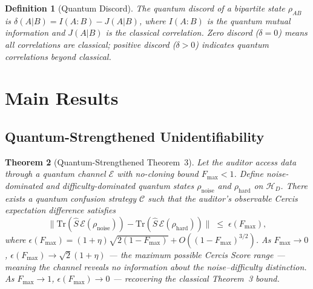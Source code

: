 \documentclass[12pt,a4paper]{article}
\newtheorem{theorem}{Theorem}[section]
\newtheorem{definition}[theorem]{Definition}
\newcommand{\cH}{\mathcal{H}}
\newcommand{\cE}{\mathcal{E}}
\newcommand{\cC}{\mathcal{C}}
\newcommand{\Tr}{\mathrm{Tr}}
\begin{document}
\begin{definition}[Quantum Discord]
\label{def:discord}
The quantum discord of a bipartite state $\rho_{AB}$ is
$\delta(A|B) = I(A:B) - J(A|B)$, where $I(A:B)$ is the quantum mutual
information and $J(A|B)$ is the classical correlation.  Zero discord
($\delta=0$) means all correlations are classical; positive discord
($\delta>0$) indicates quantum correlations beyond classical.
\end{definition}

\section{Main Results}

\subsection{Quantum-Strengthened Unidentifiability}

\begin{theorem}[Quantum-Strengthened Theorem~3]
\label{thm:quantum-strong}
Let the auditor access data through a quantum channel $\cE$ with no-cloning
bound $F_{\max}<1$.  Define noise-dominated and difficulty-dominated quantum
states $\rho_{\mathrm{noise}}$ and $\rho_{\mathrm{hard}}$ on $\cH_D$.
There exists a quantum confusion strategy $\cC$ such that the auditor's
observable Cercis expectation difference satisfies
\begin{equation}\label{eq:quantum-barrier}
    \big\|\Tr(\hat{S}\,\cE(\rho_{\mathrm{noise}}))
          - \Tr(\hat{S}\,\cE(\rho_{\mathrm{hard}}))\big\|
    \;\leq\; \epsilon(F_{\max}),
\end{equation}
where $\epsilon(F_{\max}) = (1+\eta)\sqrt{2(1-F_{\max})} + O((1-F_{\max})^{3/2})$.
As $F_{\max}\to0$, $\epsilon(F_{\max})\to\sqrt{2}(1+\eta)$ — the maximum
possible Cercis Score range — meaning the channel reveals \emph{no}
information about the noise--difficulty distinction.  As $F_{\max}\to1$,
$\epsilon(F_{\max})\to0$ — recovering the classical Theorem~3 bound.
\end{theorem}
\end{document}
